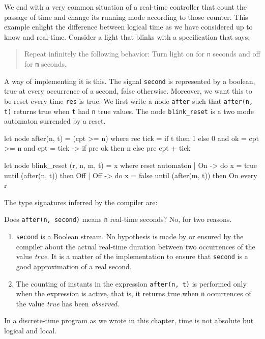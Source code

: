 \documentclass[11pt,titlepage,twoside]{report}
\begin{document}


We end with a very common situation of a real-time controller that count
the passage of time and change its running mode according to those counter. This
example enlight the difference between logical time as we have considered up to know
and real-time. Consider a light that
blinks with a specification that says:

\begin{quote}
  Repeat infinitely the following behavior:
  Turn light on for \texttt{n} seconds and off for
  \texttt{m} seconds.
\end{quote}

A way of implementing it is this. The signal \texttt{second} is
represented by a boolean, true at every occurrence of a second, false
otherwise. Moreover, we want this to be reset every time \texttt{res}
is true. We first write a node \texttt{after} such that
\texttt{after(n, t)} returns true when \texttt{t} had \texttt{n} true
values. The node \texttt{blink\_reset} is a two mode automaton
surrended by a reset.
\begin{chklisting}[withresult,label=after,label=blink_reset]
let node after(n, t) = (cpt >= n) where
  rec tick = if t then 1 else 0
  and ok = cpt >= n
  and cpt = tick -> if pre ok then n else pre cpt + tick

let node blink_reset (r, n, m, t) = x where
 reset
   automaton
   | On  -> do x = true  until (after(n, t)) then Off
   | Off -> do x = false until (after(m, t)) then On
 every r
\end{chklisting}

\medskip
The type signatures inferred by the compiler are:
\chklistingmsg{}

Does \texttt{after(n, second)} means \texttt{n} real-time seconds? No, for two reasons.
\begin{enumerate}
\item
  \texttt{second} is a Boolean stream. No hypothesis is made by or
  ensured by the compiler about the
  actual real-time duration between two occurrences of the value
  \emph{true}. It is a matter of the implementation to ensure that
  \texttt{second} is a good approximation of a real second.
\item
  The counting of instants in the expression
  \texttt{after(n, t)} is performed only when the expression is active, that is,
  it returns true when \texttt{n} occurrences of the value \emph{true} has
  been \emph{observed}.
\end{enumerate}
In a discrete-time program as we wrote in this chapter, time is not absolute but
logical and local.
  
\end{document}
